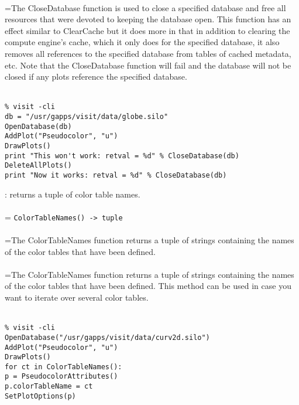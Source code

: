 \documentclass[10pt,a4paper]{report}
\begin{document}
 \\ 
\hangindent=\parindent The CloseDatabase function is used to close a specified database and free all resources that were devoted to keeping the database open. This function has an effect similar to ClearCache but it does more in that in addition to clearing the compute engine's cache, which it only does for the specified database, it also removes all references to the specified database from tables of cached metadata, etc. Note that the CloseDatabase function will fail and the database will not be closed if any plots reference the specified database. \\[-3mm] 

\\[-6mm]
\begin{verbatim}% visit -cli
db = "/usr/gapps/visit/data/globe.silo"
OpenDatabase(db)
AddPlot("Pseudocolor", "u")
DrawPlots()
print "This won't work: retval = %d" % CloseDatabase(db)
DeleteAllPlots()
print "Now it works: retval = %d" % CloseDatabase(db)
\end{verbatim}
\newpage


{}
: returns a tuple of color table names.\\[-3mm]

 \\ 
\hangindent=\parindent 
\verb!ColorTableNames() -> tuple!\\ [-3mm]

 \\ 
\hangindent=\parindent The ColorTableNames function returns a tuple of strings containing the names of the color tables that have been defined. \\[-3mm] 

 \\ 
\hangindent=\parindent The ColorTableNames function returns a tuple of strings containing the names of the color tables that have been defined. This method can be used in case you want to iterate over several color tables. \\[-3mm] 

\\[-6mm]
\begin{verbatim}% visit -cli 
OpenDatabase("/usr/gapps/visit/data/curv2d.silo")
AddPlot("Pseudocolor", "u")
DrawPlots()
for ct in ColorTableNames():
p = PseudocolorAttributes()
p.colorTableName = ct
SetPlotOptions(p)
\end{verbatim}
\newpage
\end{document}
